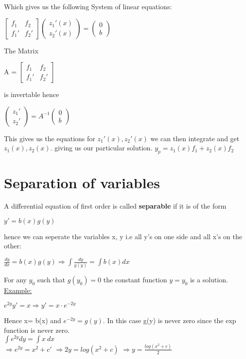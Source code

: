 \documentclass[8pt]{extreport}
\begin{document}
\begin{itemize}
\begin{center}
\end{center}
Which gives us the following System of linear equations:
\begin{center}
$\begin{bmatrix}
f_1 & f_2 \\[0.5em] f_1' & f_2'
\end{bmatrix} \left(\!\!\!\begin{array}{c} z_1'(x)\\[0.5em] z_2'(x)  \end{array}\!\!\!\right) = \left(\!\!\!\begin{array}{c} 0\\[0.5em] b\end{array}\!\!\!\right)$
\end{center}
The Matrix
\begin{center}
A = $\begin{bmatrix}
f_1 & f_2 \\[0.5em] f_1' & f_2'
\end{bmatrix}$
\end{center}
is invertable hence
\begin{center}
$\left(\!\!\! \begin{array}{c} z_1'\\ z_2'\end{array} \!\!\!\right) = A^{-1}\left(\!\!\!\begin{array}{c}  0\\ b\end{array} \!\!\!\right)$
\end{center}
This gives us the equations for $z_1'(x),z_2'(x)$ we can then integrate and get $z_1(x),z_2(x)$. giving us our particular solution. $y_p = z_1(x)f_1 + z_2(x)f_2$ 
\end{itemize}

\section{Separation of variables}

A differential equation of first order is called \textbf{separable} if it is of the form
\begin{center}
$y' = b(x)g(y)$
\end{center}
hence we can seperate the variables x, y i.e all y's on one side and all x's on the other:
\begin{center}
$\frac{dy}{dx} = b(x)g(y) \Rightarrow \int\frac{dy}{g(y)} = \int b(x)dx$
\end{center}
For any $y_0$ such that $g(y_0) = 0$ the constant function $y = y_0$ is a solution.\\
\underline{Example:}\\
\begin{center}
$e^{2y}y' = x \Rightarrow y' = x\cdot e^{-2y}$
\end{center}
Hence x= b(x) and $e^{-2y} =g(y)$. In this case g(y) is never zero since the exp function is never zero.\\
$\int e^{2y}dy = \int x \ dx$\\
$\Rightarrow e^{2y} = x^2 + c'$
$\Rightarrow 2y = log(x^2 + c)$
$\Rightarrow y = \frac{log(x^2 + c)}{2}$
\end{document}

